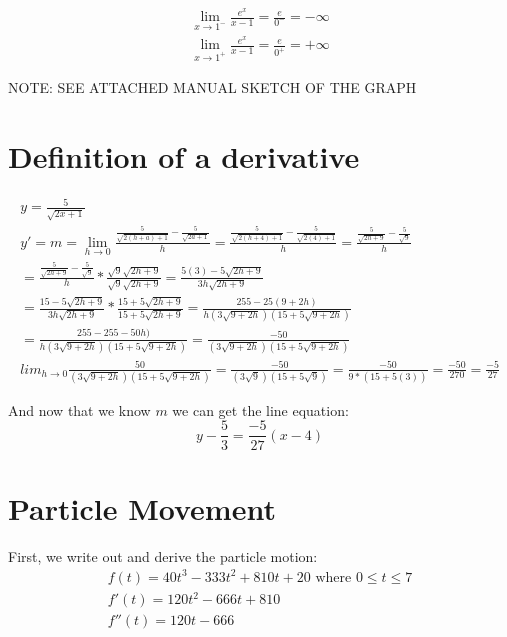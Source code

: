 \documentclass{article}
\begin{document}
\begin{eqnarray}
	\lim_{x \to 1^-} \frac{e^x}{x-1} = \frac{e}{0^-} = -\infty \\
	\lim_{x \to 1^+} \frac{e^x}{x-1} = \frac{e}{0^+} = +\infty
\end{eqnarray}

NOTE: SEE ATTACHED MANUAL SKETCH OF THE GRAPH

\section{Definition of a derivative}
\begin{eqnarray}
	y = \frac{5}{\sqrt{2x+1}} \\
	y' = m = \lim_{h \to 0} \frac{\frac{5}{\sqrt{2(h+a)+1}} - \frac{5}{\sqrt{2a+1}}}{h}
	= \frac{\frac{5}{\sqrt{2(h+4)+1}} - \frac{5}{\sqrt{2(4)+1}}}{h}
	= \frac{\frac{5}{\sqrt{2h+9}} - \frac{5}{\sqrt{9}}}{h} \\
	= \frac{\frac{5}{\sqrt{2h+9}} - \frac{5}{\sqrt{9}}}{h} * \frac{\sqrt{9}\sqrt{2h+9}}{\sqrt{9}\sqrt{2h+9}}
	= \frac{5(3) - 5\sqrt{2h + 9}}{3h\sqrt{2h+9}} \\
	= \frac{15 - 5\sqrt{2h + 9}}{3h\sqrt{2h+9}} 
	* \frac{15 + 5\sqrt{2h + 9}}{15 + 5\sqrt{2h + 9}} 
	= \frac{255-25(9 + 2h)}{h(3\sqrt{9+2h})(15 + 5\sqrt{9+2h})} \\
	= \frac{255-255 - 50h)}{h(3\sqrt{9+2h})(15 + 5\sqrt{9+2h})}
	= \frac{-50}{(3\sqrt{9+2h})(15 + 5\sqrt{9+2h})} \\
	lim_{h \to 0} \frac{50}{(3\sqrt{9+2h})(15 + 5\sqrt{9+2h})}  
	= \frac{-50}{(3\sqrt{9})(15 + 5\sqrt{9})}
	= \frac{-50}{9 * (15 + 5(3))} = \frac{-50}{270} = \frac{-5}{27}
\end{eqnarray}

And now that we know $m$ we can get the line equation:
\begin{equation}
	y - \frac{5}{3} = \frac{-5}{27} (x - 4)
\end{equation}

\section{Particle Movement}
First, we write out and derive the particle motion:
\begin{eqnarray}
	f(t) = 40t^3 - 333t^2 + 810t + 20 \text{ where } 0 \leq t \leq 7 \\
	f'(t) = 120t^2 - 666t + 810 \\
	f''(t) = 120t - 666
\end{eqnarray}
\end{document}
